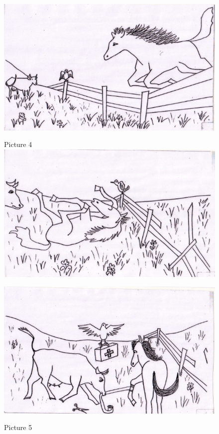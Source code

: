 \documentclass[output=paper,colorlinks,citecolor=brown,modfonts,nonflat]{../langscibook}
\begin{document}
\begin{paperappendix}
\begin{figure}
\includegraphics[width=\textwidth]{figures/leclerq-img003.png}
\end{figure}




\begin{figure}
Picture 4
\includegraphics[width=\textwidth]{figures/leclerq-img004.png}
\end{figure}

\begin{figure}


\includegraphics[width=\textwidth]{figures/leclerq-img005.png}


Picture 5
\end{figure}
\end{paperappendix}
\end{document}
